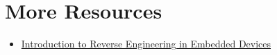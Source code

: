 \documentclass[12pt,a4paper, brazil]{article}
\begin{document}
\section{More Resources}

\begin{tcolorbox}[enhanced, dropshadow, title=Full-on Reversing, colback=blue!10]
    \begin{itemize}
        \item \href{https://voidstarsec.com/blog/intro-to-embedded-part-1}{Introduction to Reverse Engineering in Embedded Devices}
    \end{itemize}
\end{tcolorbox}

\printbibliography
\end{document}
